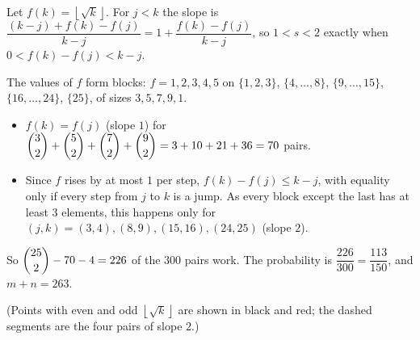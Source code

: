 Let $f(k)=\left\lfloor\sqrt k\right\rfloor$. For $j<k$ the slope is $\dfrac{(k-j)+f(k)-f(j)}{k-j}=1+\dfrac{f(k)-f(j)}{k-j}$, so $1<s<2$ exactly when $0<f(k)-f(j)<k-j$.

The values of $f$ form blocks: $f=1,2,3,4,5$ on $\{1,2,3\}$, $\{4,\dots,8\}$, $\{9,\dots,15\}$, $\{16,\dots,24\}$, $\{25\}$, of sizes $3,5,7,9,1$.
\begin{itemize}
\item $f(k)=f(j)$ (slope $1$) for $\dbinom32+\dbinom52+\dbinom72+\dbinom92=3+10+21+36=70$ pairs.
\item Since $f$ rises by at most $1$ per step, $f(k)-f(j)\le k-j$, with equality only if every step from $j$ to $k$ is a jump. As every block except the last has at least $3$ elements, this happens only for $(j,k)=(3,4),(8,9),(15,16),(24,25)$ (slope $2$).
\end{itemize}
So $\dbinom{25}{2}-70-4=226$ of the $300$ pairs work. The probability is $\dfrac{226}{300}=\dfrac{113}{150}$, and $m+n=\boxed{263}$.


(Points with even and odd $\left\lfloor\sqrt k\right\rfloor$ are shown in black and red; the dashed segments are the four pairs of slope $2$.)
